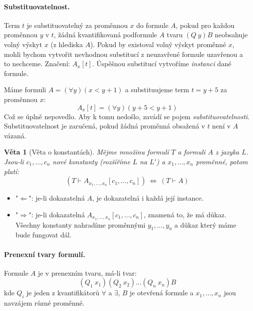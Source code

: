 \documentclass[a4paper]{article}      %
\newtheorem{theorem}{Věta}[section]
\newenvironment{proof}[1][Důkaz]{\begin{trivlist}
\item[\hskip \labelsep {\bfseries #1}]}{\end{trivlist}}
\newenvironment{example}[1][Příklad]{\begin{trivlist}
\item[\hskip \labelsep {\bfseries #1}]}{\end{trivlist}}
\begin{document}
\paragraph{Substituovatelnost.} Term $t$ je substituovatelný za proměnnou $x$ do formule $A$, pokud pro každou proměnnou $y$ v $t$, žádná kvantifikovaná podformule $A$ tvaru $(Q\ y) B$ neobsahuje volný výskyt $x$ (z hlediska $A$).
Pokud by existoval volný výskyt proměnné $x$,
mohli bychom vytvořit nevhodnou substitucí z neuzavřené formule uzavřenou a to nechceme. Značení: $A_{x}[t]$.
Úspěšnou substitucí vytvoříme \emph{instanci} dané formule.

\begin{example}[Špatná substituce]
Máme formuli $A = (\forall y) (x < y + 1)$ a substituujeme term $t = y + 5$ za proměnnou $x$:
\[
A_{x}[t] = (\forall y)(y + 5 < y + 1)
\]
Což se úplně nepovedlo. Aby k tomu nedošlo, zavádí se pojem \emph{substituovatelnosti}.
Substituovatelnost je zaručená, pokud žádná proměnná obsažená v $t$ není v $A$ vázaná.
\end{example}
 
\begin{theorem}[Věta o konstantách]
Mějme množinu formulí $T$ a formuli $A$ z jazyka $L$. Jsou-li $c_1,\ldots,c_{n}$ nové konstanty (rozšíříme $L$ na $L'$) a
$x_1,\ldots,x_{n}$ proměnné, potom platí:
\[
(T \vdash A_{x_1,\ldots,x_{n}}[c_1,\ldots,c_{n}])\ \Leftrightarrow\ (T \vdash A)
\]
\end{theorem}

\begin{proof}
\begin{itemize}
\item "$\Leftarrow$": je-li dokazatelná $A$, je dokazatelná i každá její instance.
\item "$\Rightarrow$": je-li dokazatelná $A_{x_1,\ldots,x_{n}}[c_1,\ldots,c_{n}]$, znamená to, že má důkaz. Všechny konstanty nahradíme
proměnnými $y_1,\ldots,y_{n}$ a důkaz který máme bude fungovat dál. 
\end{itemize}
\end{proof}

\paragraph{Prenexní tvary formulí.} Formule $A$ je v prenexním tvaru, má-li tvar:
\[
(Q_1\ x_1)(Q_2\ x_2)\ldots(Q_n\ x_n)B
\]
kde $Q_i$ je jeden z kvantifikátorů $\forall$ a $\exists$, $B$ je otevřená formule a $x_1,\ldots,x_n$ jsou navzájem různé proměnné.
\end{document}
